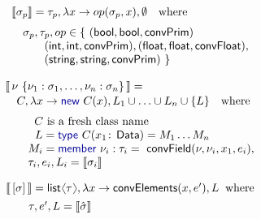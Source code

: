 \documentclass[10pt,preprint,blind,clearpagebib]{sigplanconf}
\newcommand{\langl}{\begin{picture}(4.5,7)
\put(1.1,2.5){\rotatebox{60}{\line(1,0){5.5}}}
\put(1.1,2.5){\rotatebox{300}{\line(1,0){5.5}}}
\end{picture}}
\newcommand{\rangl}{\begin{picture}(4.5,7)
\put(.9,2.5){\rotatebox{120}{\line(1,0){5.5}}}
\put(.9,2.5){\rotatebox{240}{\line(1,0){5.5}}}
\end{picture}}
\newcommand{\kvd}[1]{\textnormal{\textcolor{kvdclr}{\sffamily #1}}}
\newcommand{\ident}[1]{\textnormal{\sffamily #1}}
\newcommand{\sem}[1]{\llbracket #1 \rrbracket}
\begin{document}
\begin{figure}
\begin{multicols}{2}

\noindent
\begin{equation*}
\begin{array}{l} 
 \sem{\sigma_p} = \tau_p,\lambda x\rightarrow op(\sigma_p, x),\emptyset\quad\textnormal{where} \\[0.6em] 
 \quad\sigma_p, \tau_p, op\in  \{~ (\ident{bool}, \ident{bool}, \ident{convPrim})\\
 \hspace{2.9em} (\ident{int}, \ident{int}, \ident{convPrim}), (\ident{float},\ident{float},\ident{convFloat}),\\
 \hspace{2.9em} (\ident{string},\ident{string},\ident{convPrim}) ~\}
\end{array} 
\end{equation*}
\vspace{-2em}

\begin{equation*}
\begin{array}{l}
 \sem{\,\nu~ \{ \nu_1 : \sigma_1, \ldots, \nu_n : \sigma_n \}\,} = \\[0.1em]
 \quad C, \lambda x\rightarrow \kvd{new}~C(x), L_1\cup\ldots\cup L_n\cup\{ L \}\quad\textnormal{where}\\[0.6em]
 \qquad \;\;C~\textnormal{is a fresh class name} \\
 \qquad \;\,\,L = \kvd{type}~C(x_1\!:\!\ident{Data})=M_1 \ldots M_n \\
 \qquad M_i = \kvd{member}~\nu_i:\tau_i=\ident{convField}(\nu, \nu_i, x_1, e_i),\\
 \qquad \tau_i, e_i, L_i = \sem{\sigma_i} 
\end{array}
\end{equation*}
\vspace{-2em}

\begin{equation*}
\begin{array}{l}
 \sem{\,[\sigma]\,} = \ident{list}\langl\tau\rangl, \lambda x \rightarrow \ident{convElements}(x, e'), L \;\;\textnormal{where}\\[0.4em]
 \qquad \tau, e', L = \sem{\hat{\sigma}}
\end{array}
\end{equation*}


\end{multicols}
\end{figure}
\end{document}
